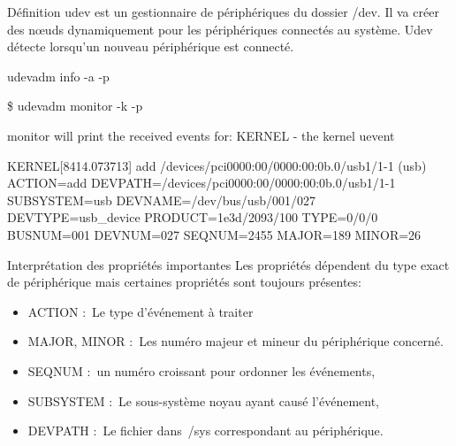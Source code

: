 \documentclass{beamer}
\begin{document}
\begin{frame}
\begin{block}{Définition} 
	udev est un gestionnaire de périphériques du dossier /dev. Il va créer des nœuds dynamiquement pour les périphériques connectés au système. 
	Udev détecte lorsqu'un nouveau périphérique est connecté. 
\end{block}
\begin{exampleblock}{udevadm info -a -p} 
	
	\tiny{\$  udevadm monitor -k -p
		
		monitor will print the received events for:
		KERNEL - the kernel uevent
		
		KERNEL[8414.073713] add      /devices/pci0000:00/0000:00:0b.0/usb1/1-1 (usb)\newline
		ACTION=add\newline
		DEVPATH=/devices/pci0000:00/0000:00:0b.0/usb1/1-1\newline
		SUBSYSTEM=usb\newline
		DEVNAME=/dev/bus/usb/001/027\newline
		DEVTYPE=usb\_device\newline
		PRODUCT=1e3d/2093/100\newline
		TYPE=0/0/0\newline
		BUSNUM=001\newline
		DEVNUM=027\newline
		SEQNUM=2455\newline
		MAJOR=189\newline
		MINOR=26\newline}
\end{exampleblock}
 
\end{frame}

\begin{frame}
\begin{exampleblock}{Interprétation des propriétés importantes} 
Les propriétés dépendent du type exact de périphérique mais certaines propriétés sont toujours présentes:
\begin{itemize}
	[circle]
	\item ACTION : Le type d’événement à traiter
	\item MAJOR, MINOR : Les numéro majeur et mineur du périphérique concerné. 
    \item SEQNUM : un numéro croissant pour ordonner les événements, 
    \item SUBSYSTEM : Le sous-système noyau ayant causé l’événement, 
	\item DEVPATH : Le fichier dans /sys correspondant au périphérique. 
\end{itemize}
\end{exampleblock}
\end{frame}
\end{document}

